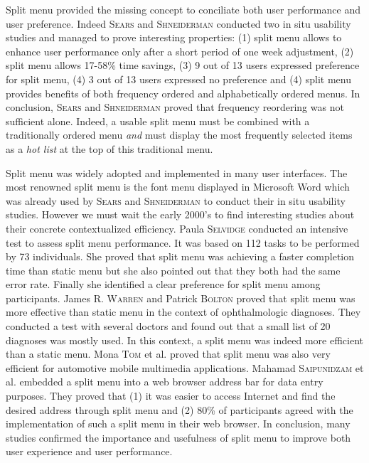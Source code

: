 \begin{figure}[!ht]
    
    \label{fig:sears_split}
\end{figure}

Split menu provided the missing concept to conciliate both user performance and 
user preference. Indeed \textsc{Sears} and \textsc{Shneiderman} conducted two 
in situ usability 
studies and managed to prove interesting properties: (1) split menu allows to 
enhance user performance only after a short period of one week adjustment, (2) 
split menu allows 17-58\% time savings, (3) 9 out of 13 users expressed 
preference for split menu, (4) 3 out of 13 users expressed no preference and 
(4) split menu provides benefits of both frequency ordered and alphabetically 
ordered menus. In conclusion, \textsc{Sears} and \textsc{Shneiderman} proved 
that frequency reordering was not sufficient alone. Indeed, a usable 
split menu must be combined with a traditionally ordered menu \textit{and} must 
display the most frequently selected items as a \textit{hot list} at the top of 
this 
traditional menu.\newline

Split menu was widely adopted and implemented in many user interfaces. The most 
renowned split menu is the font menu displayed in Microsoft Word which 
was already used by \textsc{Sears} and \textsc{Shneiderman} to conduct their in 
situ usability studies. However we must wait the early 2000’s to find 
interesting studies about their concrete contextualized efficiency. Paula 
\textsc{Selvidge} \cite{paula} conducted an intensive test to assess split menu 
performance. It was based on 112 tasks to be performed by 73 individuals. She 
proved that split menu was achieving a faster completion time than static menu 
but she also pointed out that they both had the same error rate. Finally she 
identified a clear preference for split menu among participants. James R. 
\textsc{Warren} and Patrick \textsc{Bolton} \cite{warren_bolton} proved that 
split menu was more effective than static menu in the context of ophthalmologic 
diagnoses. They conducted a test with several doctors and found out that a small 
list of 20 diagnoses was mostly used. In this context, a split menu was indeed 
more efficient than a static menu. Mona \textsc{Tom} et al. \cite{mona} proved 
that split menu was also very efficient for automotive mobile multimedia 
applications. Mahamad \textsc{Saipunidzam} et al. \cite{saipu} embedded a split 
menu into a web browser address bar for data entry purposes. They proved that 
(1) it was easier to access Internet and find the desired address through split 
menu and (2) 80\% of participants agreed with the implementation of such a 
split menu in their web browser. In conclusion, many studies confirmed the 
importance and usefulness of split menu to improve both user experience and 
user performance.

